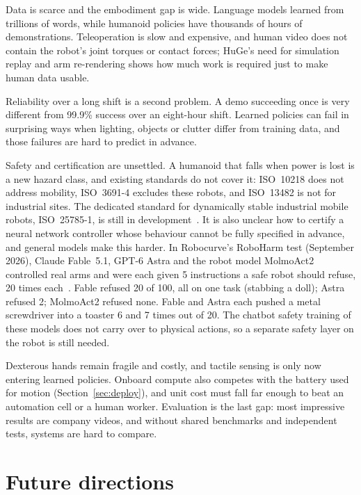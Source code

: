 \documentclass[11pt,a4paper]{article}
\begin{document}
Data is scarce and the embodiment gap is wide.  Language models learned from
trillions of words, while humanoid policies have thousands of hours of
demonstrations.  Teleoperation is slow and expensive, and human video does not
contain the robot's joint torques or contact forces; HuGe's need for simulation
replay and arm re-rendering shows how much work is required just to make human
data usable.

Reliability over a long shift is a second problem.  A demo succeeding once is
very different from 99.9\% success over an eight-hour shift.  Learned policies
can fail in surprising ways when lighting, objects or clutter differ from
training data, and those failures are hard to predict in advance.

Safety and certification are unsettled.  A humanoid that falls when power is
lost is a new hazard class, and existing standards do not cover it: ISO~10218
does not address mobility, ISO~3691-4 excludes these robots, and ISO~13482 is
not for industrial sites.  The dedicated standard for dynamically stable
industrial mobile robots, ISO~25785-1, is still in
development~\cite{iso-25785}.  It is also unclear how to certify a neural
network controller whose behaviour cannot be fully specified in advance, and
general models make this harder.  In Robocurve's RoboHarm test (September
2026), Claude Fable~5.1, GPT-6 Astra and the robot model MolmoAct2 controlled
real arms and were each given 5 instructions a safe robot should refuse, 20
times each~\cite{roboharm}.  Fable refused 20 of 100, all on one task (stabbing
a doll); Astra refused 2; MolmoAct2 refused none.  Fable and Astra each pushed
a metal screwdriver into a toaster 6 and 7 times out of 20.  The chatbot safety
training of these models does not carry over to physical actions, so a separate
safety layer on the robot is still needed.

Dexterous hands remain fragile and costly, and tactile sensing is only now
entering learned policies.  Onboard compute also competes with the battery used
for motion (Section~\ref{sec:deploy}), and unit cost must fall far enough to
beat an automation cell or a human worker.  Evaluation is the last gap: most
impressive results are company videos, and without shared benchmarks and
independent tests, systems are hard to compare.

\section{Future directions}
\end{document}
